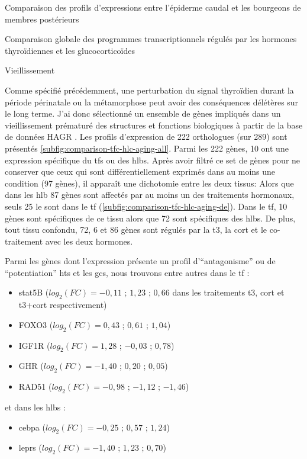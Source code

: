 \documentclass[../main.tex]{subfiles}
\begin{document}
\begin{chapter}{Comparaison des profils d'expressions entre l'épiderme caudal et les bourgeons de membres postérieurs}
\begin{section}{Comparaison globale des programmes transcriptionnels régulés par les hormones thyroïdiennes et les glucocorticoïdes}


\end{section}


\begin{section}{Vieillissement}

Comme spécifié précédemment, une perturbation du signal thyroïdien durant la période périnatale ou la métamorphose peut avoir des conséquences délétères sur le long terme.
J'ai donc sélectionné un ensemble de gènes impliqués dans un vieillissement prématuré des structures et fonctions biologiques à partir de la base de données HAGR \citep{DeMagalhaes2005}.
Les profils d'expression de 222 orthologues (sur 289) sont présentés \autoref{subfig:comparison-tfc-hlc-aging-all}.
Parmi les 222 gènes, 10 ont une expression spécifique du \glspl{tf} ou des \glspl{hlb}.
Après avoir filtré ce set de gènes pour ne conserver que ceux qui sont différentiellement exprimés dans au moins une condition (97 gènes), il apparaît une dichotomie entre les deux tissus:
Alors que dans les \gls{hlb} 87 gènes sont affectés par au moins un des traitements hormonaux, seuls 25 le sont dans le \gls{tf} (\autoref{subfig:comparison-tfc-hlc-aging-de}).
Dans le \gls{tf}, 10 gènes sont spécifiques de ce tissu alors que 72 sont spécifiques des \glspl{hlb}. 
De plus, tout tissu confondu, 72, 6 et 86 gènes sont régulés par la \gls{t3}, la \gls{cort} et le co-traitement avec les deux hormones.
\par
Parmi les gènes dont l'expression présente un profil d'``antagonisme'' ou de ``potentiation'' \glspl{ht} et les \glspl{gc}, nous trouvons entre autres dans le \gls{tf} :
\begin{itemize}
\item \gls{stat5}B ($log_2(FC)=-0,11$ ; $1,23$ ; $0,66$ dans les traitements \gls{t3}, \gls{cort} et \gls{t3}+\gls{cort} respectivement)
\item FOXO3 ($log_2(FC)=0,43$ ; $0,61$ ; $1,04$)
\item IGF1R ($log_2(FC)=1,28$ ; $-0,03$ ; $0,78$)
\item GHR ($log_2(FC)=-1,40$ ; $0,20$ ; $0,05$)
\item RAD51 ($log_2(FC)=-0,98$ ; $-1,12$ ; $-1,46$)
\end{itemize}
et dans les \glspl{hlb} :
\begin{itemize}
\item \gls{cebpa} ($log_2(FC)=-0,25$ ; $0,57$ ; $1,24$)
\item \glspl{lepr} ($log_2(FC)=-1,40$ ; $1,23$ ; $0,70$)

\end{itemize}
\end{section}
\end{chapter}
\end{document}
